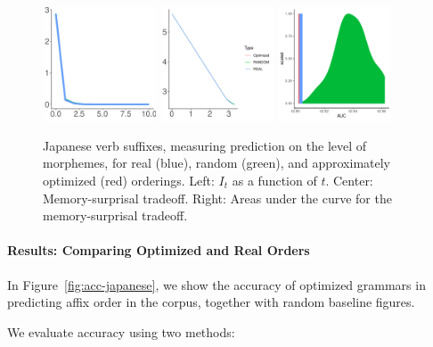 \begin{figure}
	\begin{center}
\includegraphics[width=0.3\textwidth]{figures/Japanese-suffixes-byMorphemes-it.pdf}
\includegraphics[width=0.3\textwidth]{figures/Japanese-suffixes-byMorphemes-memsurp.pdf}
\includegraphics[width=0.3\textwidth]{figures/Japanese-suffixes-byMorphemes-auc-hist.pdf}
\end{center}
	\caption{Japanese verb suffixes, measuring prediction on the level of morphemes, for real (blue), random (green), and approximately optimized (red) orderings. Left: $I_t$ as a function of $t$. Center: Memory-surprisal tradeoff. Right: Areas under the curve for the memory-surprisal tradeoff.}\label{fig:jap-morph}
\end{figure}


\paragraph{Results: Comparing Optimized and Real Orders}

In Figure~\ref{fig:acc-japanese}, we show the accuracy of optimized grammars in predicting affix order in the corpus, together with random baseline figures.

We evaluate accuracy using two methods:

